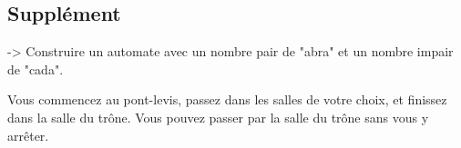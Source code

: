 \documentclass{article}
\begin{document}
\vspace{1cm}

\centering\subsection*{Supplément}
-> Construire un automate avec un nombre pair de "abra" et un nombre impair de "cada".

Vous commencez au pont-levis, passez dans les salles de votre choix, et finissez dans la salle du trône. 
Vous pouvez passer par la salle du trône sans vous y arrêter.

\vspace{1cm}



 
\end{document}
